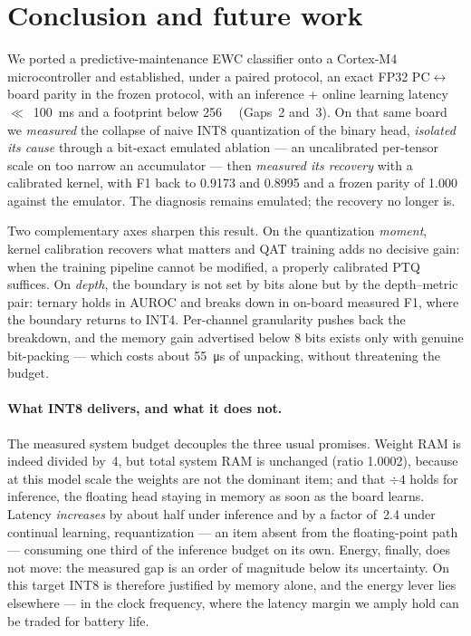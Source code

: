 \section{Conclusion and future work}
\label{sec:conclusion}

We ported a predictive-maintenance EWC classifier onto a Cortex-M4 microcontroller and established, under a
paired protocol, an exact FP32 PC$\leftrightarrow$board parity in the frozen protocol, with an inference +
online learning latency $\ll$~\SI{100}{\milli\second} and a footprint below \SI{256}{\kilo\byte} (Gaps~2
and~3). On that same board we \emph{measured} the collapse of naive INT8 quantization of the binary head,
\emph{isolated its cause} through a bit-exact emulated ablation --- an uncalibrated per-tensor scale on too
narrow an accumulator --- then \emph{measured its recovery} with a calibrated kernel, with F1 back to
\num{0.9173} and \num{0.8995} and a frozen parity of \num{1.000} against the emulator. The diagnosis
remains emulated; the recovery no longer is.

Two complementary axes sharpen this result. On the quantization \emph{moment}, kernel calibration recovers
what matters and QAT training adds no decisive gain: when the training pipeline cannot be modified, a
properly calibrated PTQ suffices. On \emph{depth}, the boundary is not set by bits alone but by the
depth--metric pair: ternary holds in AUROC and breaks down in on-board measured F1, where the boundary
returns to INT4. Per-channel granularity pushes back the breakdown, and the memory gain advertised below
8 bits exists only with genuine
bit-packing --- which costs about \SI{55}{\micro\second} of unpacking, without threatening the budget.

\paragraph{What INT8 delivers, and what it does not.} The measured system budget decouples the three usual
promises. Weight RAM is indeed divided by~4, but total system RAM is unchanged (ratio \num{1.0002}),
because at this model scale the weights are not the dominant item; and that $\div 4$ holds for inference,
the floating head staying in memory as soon as the board learns. Latency \emph{increases} by about half
under inference and by a factor of~\num{2.4} under continual learning, requantization --- an item absent
from the floating-point path --- consuming one third of the inference budget on its own. Energy, finally, does not move: the measured gap is an order of magnitude below its uncertainty. On
this target INT8 is therefore justified by memory alone, and the energy lever lies elsewhere --- in the
clock frequency, where the latency margin we amply hold can be traded for battery life.

